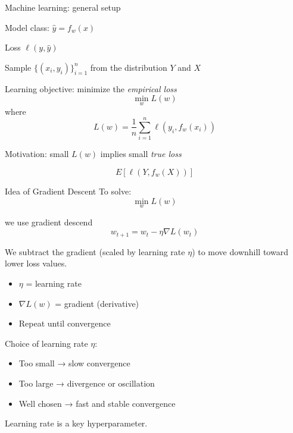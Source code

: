 \documentclass{beamer}
\begin{document}
\begin{frame}{Machine learning: general setup}
 
Model class: $\hat{y} = f_w(x)$

\medskip


Loss $\ell(y, \hat{y})$

\medskip

Sample $\{(x_i, y_i)\}_{i=1}^n$ from the distribution $Y$ and $X$

\medskip

Learning objective: minimize the \emph{empirical loss} 
\[
\min_w L(w)
\]
where 
\[ 
   L(w)=\frac{1}{n} \sum_{i=1}^n \ell(y_i, f_w(x_i))
\]


Motivation: small $L(w)$ implies small \emph{true loss}

\[ E[\ell(Y, f_w(X))] \]

\end{frame}
\begin{frame}{Idea of Gradient Descent}
To solve:
\[
\min_{w} L(w)
\]

we use gradient descend
\[
w_{t+1} = w_t - \eta \nabla L(w_t)
\]

We subtract the gradient (scaled by learning rate $\eta$) to move downhill toward lower loss values.

\begin{itemize}
    \item $\eta$ = learning rate
    \item $\nabla L(w)$ = gradient (derivative)
    \item Repeat until convergence
\end{itemize}

Choice of learning rate $\eta$:

\begin{itemize}
    \item Too small → slow convergence
    \item Too large → divergence or oscillation
    \item Well chosen → fast and stable convergence
\end{itemize}

\vspace{0.5cm}

Learning rate is a key hyperparameter.

\end{frame}
\end{document}

